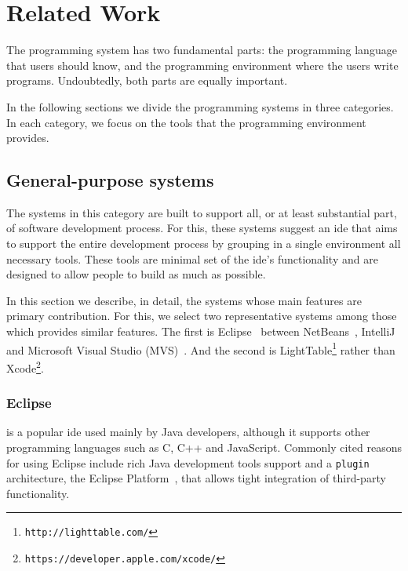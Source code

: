 
% 
% 

\section{Related Work}
\label{sec:rw}
The programming system has two fundamental parts: the programming language that users should know, and the programming environment where the users write programs. Undoubtedly, both parts are equally important.

In the following sections we divide the programming systems in three categories. In each category, we focus on the tools that the programming environment provides.
\subsection{General-purpose systems}

The systems in this category are built to support all, or at least substantial part, of software development process. For this, these systems suggest an \ac{ide} that aims to support the entire development process by grouping in a single environment all necessary tools. These tools are minimal set of the \ac{ide}'s functionality and are designed to allow people to build as much as possible.

In this section we describe, in detail, the systems whose main features are primary contribution. For this, we select two representative systems among those which provides similar features. The first is Eclipse~\cite{carlson2005eclipse} between NetBeans~\cite{boudreau2002netbeans}, IntelliJ~\cite{intellij2001intellij} and Microsoft Visual Studio (MVS)~\cite{guckenheimer2006software}. And the second is LightTable\footnote{\label{lt:note}\texttt{http://lighttable.com/}} rather than Xcode\footnote{\texttt{https://developer.apple.com/xcode/}}.
\subsubsection{Eclipse~\cite{carlson2005eclipse}} is a popular \ac{ide} used mainly by Java developers, although it supports other programming languages such as C, C++ and JavaScript. Commonly cited reasons for using Eclipse include rich Java development tools support and a \texttt{plugin} architecture, the Eclipse Platform~\cite{DesRivieres2004}, that allows tight integration of third-party functionality.

